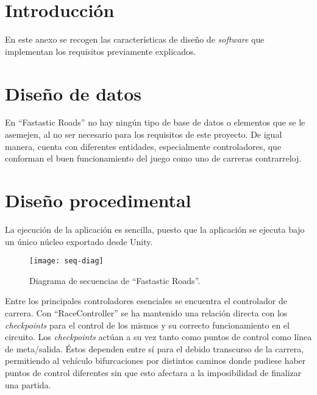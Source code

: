 
\section{Introducción}

En este anexo se recogen las características de diseño de \textit{software} que implementan los requisitos previamente explicados.

\section{Diseño de datos}

En ``Fastastic Roads'' no hay ningún tipo de base de datos o elementos que se le asemejen, al no ser necesario para los requisitos de este proyecto. De igual manera, cuenta con diferentes entidades, especialmente controladores, que conforman el buen funcionamiento del juego como uno de carreras contrarreloj.


\section{Diseño procedimental}

La ejecución de la aplicación es sencilla, puesto que la aplicación se ejecuta bajo un único núcleo exportado desde Unity.

\begin{figure}[h]
	\centering
	\texttt{[image: seq-diag]}
	\caption{Diagrama de secuencias de ``Fastastic Roads''.}
	\label{fig:seq-diag}
\end{figure}

Entre los principales controladores esenciales se encuentra el controlador de carrera. Con ``RaceController'' se ha mantenido una relación directa con los \textit{checkpoints} para el control de los mismos y su correcto funcionamiento en el circuito. Los \textit{checkpoints} actúan a su vez tanto como puntos de control como línea de meta/salida. Éstos dependen entre sí para el debido transcurso de la carrera, permitiendo al vehículo bifurcaciones por distintos caminos donde pudiese haber puntos de control diferentes sin que esto afectara a la imposibilidad de finalizar una partida. 


